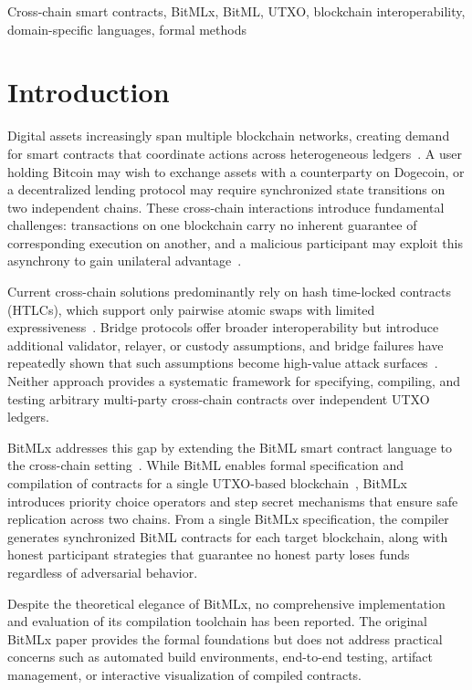 \documentclass[journal]{IEEEtran}
\begin{document}
\begin{IEEEkeywords}
Cross-chain smart contracts, BitMLx, BitML, UTXO, blockchain interoperability, domain-specific languages, formal methods
\end{IEEEkeywords}

\section{Introduction}

Digital assets increasingly span multiple blockchain networks, creating demand for smart contracts that coordinate actions across heterogeneous ledgers~\cite{bonneau2015sok,nakamoto2008bitcoin}. A user holding Bitcoin may wish to exchange assets with a counterparty on Dogecoin, or a decentralized lending protocol may require synchronized state transitions on two independent chains. These cross-chain interactions introduce fundamental challenges: transactions on one blockchain carry no inherent guarantee of corresponding execution on another, and a malicious participant may exploit this asynchrony to gain unilateral advantage~\cite{zamyatin2021sok}.

Current cross-chain solutions predominantly rely on hash time-locked contracts (HTLCs), which support only pairwise atomic swaps with limited expressiveness~\cite{herlihy2018atomic}. Bridge protocols offer broader interoperability but introduce additional validator, relayer, or custody assumptions, and bridge failures have repeatedly shown that such assumptions become high-value attack surfaces~\cite{belchior2021survey,zamyatin2021sok}. Neither approach provides a systematic framework for specifying, compiling, and testing arbitrary multi-party cross-chain contracts over independent UTXO ledgers.

BitMLx addresses this gap by extending the BitML smart contract language to the cross-chain setting~\cite{engel2025bitmlx}. While BitML enables formal specification and compilation of contracts for a single UTXO-based blockchain~\cite{bartoletti2018bitml}, BitMLx introduces priority choice operators and step secret mechanisms that ensure safe replication across two chains. From a single BitMLx specification, the compiler generates synchronized BitML contracts for each target blockchain, along with honest participant strategies that guarantee no honest party loses funds regardless of adversarial behavior.

Despite the theoretical elegance of BitMLx, no comprehensive implementation and evaluation of its compilation toolchain has been reported. The original BitMLx paper provides the formal foundations but does not address practical concerns such as automated build environments, end-to-end testing, artifact management, or interactive visualization of compiled contracts.
\end{document}
